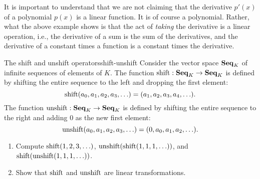 It is important to understand that we are not claiming that the
derivative $p'(x)$ of a polynomial $p(x)$ is a linear function. It is
of course a polynomial. Rather, what the above example shows is that
the act of {\em taking} the derivative is a linear operation, i.e.,
the derivative of a sum is the sum of the derivatives, and the
derivative of a constant times a function is a constant times the
derivative.

\begin{example}{The shift and unshift operators}{shift-unshift}
  Consider the vector space $\mathbf{Seq}_K$ of infinite sequences of elements
  of $K$. The function $\shift:\Seq_K\to\Seq_K$ is defined by shifting
  the entire sequence to the left and dropping the first element:
  \begin{equation*}
    \shift(a_0,a_1,a_2,a_3,\ldots) = (a_1,a_2,a_3,a_4,\ldots).
  \end{equation*}
  The function $\unshift:\Seq_K\to\Seq_K$ is defined by shifting the
  entire sequence to the right and adding $0$ as the new first
  element:
  \begin{equation*}
    \unshift(a_0,a_1,a_2,a_3,\ldots) = (0,a_0,a_1,a_2,\ldots).
  \end{equation*}
  \begin{enumialphparenastyle}
    \begin{enumerate}
    \item Compute $\shift(1,2,3,\ldots)$,
      $\unshift(\shift(1,1,1,\ldots))$, and
      $\shift(\unshift(1,1,1,\ldots))$.
    \item Show that $\shift$ and $\unshift$ are linear transformations.
    \end{enumerate}
  \end{enumialphparenastyle}
\end{example}

